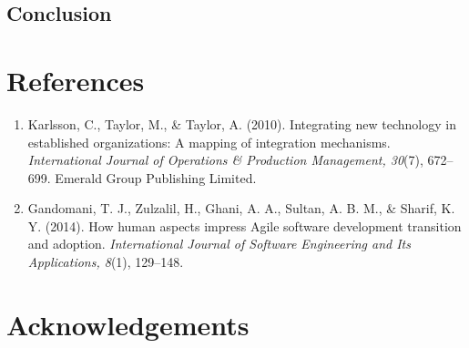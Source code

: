 \documentclass{article}
\begin{document}
\subsection{Conclusion}
\lipsum[28]

\section{References}
\begin{enumerate}
  \item Karlsson, C., Taylor, M., \& Taylor, A. (2010). Integrating new technology in established organizations: A mapping of integration mechanisms. \textit{International Journal of Operations \& Production Management, 30}(7), 672--699. Emerald Group Publishing Limited.
  
  \item Gandomani, T. J., Zulzalil, H., Ghani, A. A., Sultan, A. B. M., \& Sharif, K. Y. (2014). How human aspects impress Agile software development transition and adoption. \textit{International Journal of Software Engineering and Its Applications, 8}(1), 129--148.
\end{enumerate}

\section{Acknowledgements}
\lipsum[29]
\end{document}
